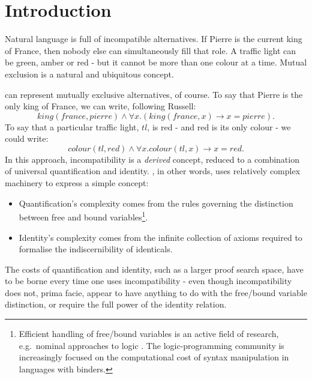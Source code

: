 \section{Introduction}\label{introduction}

Natural language is full of incompatible alternatives.
If Pierre is the current king of France, then nobody else can simultaneously fill that role.
A traffic light can be green, amber or red - but it cannot be more than one colour at a time.
Mutual exclusion is a natural and ubiquitous concept.

\FOL{} can represent mutually exclusive alternatives, of course.
To say that Pierre is the only king of France, we can write, following Russell:
\[
king(france, pierre) \land \forall x . (king(france, x) \rightarrow x = pierre).
\]
To say that a particular traffic light, $tl$, is red - and red is its only colour - we could write:
\[
colour(tl, red) \land \forall x . colour(tl, x) \rightarrow x = red.
\]
In this approach, incompatibility is a \emph{derived} concept, reduced to 
a combination of universal quantification and identity.  
\FOL{}, in other words, uses relatively complex machinery to express a
simple concept:
\begin{itemize}

\item Quantification's complexity comes from the
  rules governing the distinction between free
  and bound variables\footnote{Efficient handling of free/bound variables
    is an active field of research, e.g.~nominal approaches to logic
    \cite{PittsAM:nomsetnasics}. The logic-programming community is increasingly focused on the computational cost of
    syntax manipulation in languages with binders.}.

\item Identity's complexity comes from the infinite collection of axioms required to formalise the
  indiscernibility of identicals.

\end{itemize}

\NI The costs of quantification and identity, such as a larger proof
search space, have to be borne every time one uses incompatibility - even
though incompatibility does not, prima facie, appear to have anything to do
with the free/bound variable distinction, or require the full power of 
the identity relation.

